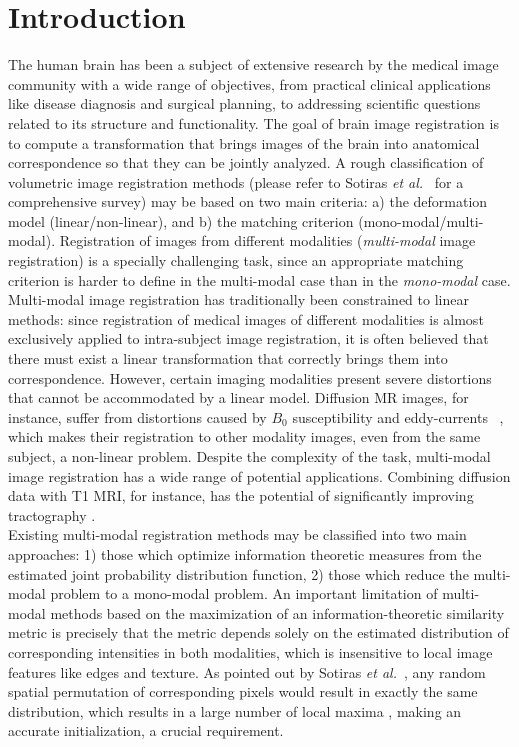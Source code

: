 \section{Introduction}
The human brain has been a subject of extensive research by the medical image community with a wide range of objectives, from practical clinical applications like disease diagnosis and surgical planning, to addressing scientific questions related to its structure and functionality. The goal of brain image registration is to compute a transformation that brings images of the brain into anatomical correspondence so that they can be jointly analyzed. A rough classification of volumetric image registration methods (please refer to Sotiras {\it et al.}~\cite{Sotiras2013} for a comprehensive survey) may be based on two main criteria: a) the deformation model (linear/non-linear), and b) the matching criterion (mono-modal/multi-modal). Registration of images from different modalities (\emph{multi-modal} image registration) is a specially challenging task, since an appropriate matching criterion is harder to define in the multi-modal case than in the \emph{mono-modal} case. Multi-modal image registration has traditionally been constrained to linear methods: since registration of medical images of different modalities is almost exclusively applied to intra-subject image registration, it is often believed that there must exist a linear transformation that correctly brings them into correspondence. However, certain imaging modalities present severe distortions that cannot be accommodated by a linear model. Diffusion MR images, for instance, suffer from distortions caused by $B_{0}$ susceptibility and eddy-currents \cite{Tournier2011}~\cite{Andersson2003}, which makes their registration to other modality images, even from the same subject, a non-linear problem. Despite the complexity of the task, multi-modal image registration has a wide range of potential applications. Combining diffusion data with T1 MRI, for instance, has the potential of significantly improving tractography \cite{Smith2012}.\\

Existing multi-modal registration methods may be classified into two main approaches: 1) those which optimize information theoretic measures from the estimated joint probability distribution function, 2) those which reduce the multi-modal problem to a mono-modal problem. An important limitation of multi-modal methods based on the maximization of an information-theoretic similarity metric is precisely that the metric depends solely on the estimated distribution of corresponding intensities in both modalities, which is insensitive to local image features like edges and texture. As pointed out by Sotiras {\it et al.}~\cite{Sotiras2013}, any random spatial permutation of corresponding pixels would
result in exactly the same distribution, which results in a large number of local maxima \cite{Roche1998}, making an accurate initialization, a crucial requirement.\\

